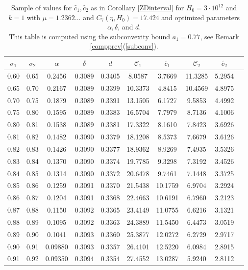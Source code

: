\documentclass[10pt]{amsart}
\newcommand{\s}{\sigma}
\theoremstyle{definition}
\numberwithin{equation}{section}
\begin{document}
%
\newpage
%
\begin{table}[h!]
\centering
\caption{Sample of values for $\tilde{c_1},\tilde{c_2}$ as in Corollary \ref{ZDinterval} for $H_0 = 3 \cdot 10^{12}$ and $k = 1$ with $\mu = 1.2362\ldots$ and $C_7(\eta, H_0) = 17.424$ and optimized parameters
$\alpha, \delta$, and $d$.\\ This table is computed using the subconvexity bound $a_1=0.77$, see Remark \ref{compprev}(\ref{subconv}).}\label{table:NSigmaOptTable2}
\begin{tabular}{cccccccccc}
\hline
$\s_1$ & $\s_2$ & $\alpha$ & $\delta$ & $d$ & $\mathcal{C}_1$ & $\tilde{c_1}$ & $\mathcal{C}_2$ & $\tilde{c_2}$ \\
\hline
0.60 & 0.65 & 0.2456 & 0.3089 & 0.3405 & 8.0587 & 3.7669 & 11.3285 & 5.2954 \\
0.65 & 0.70 & 0.2167 & 0.3089 & 0.3399 & 10.3373 & 4.8415 & 10.4569 & 4.8975 \\
0.70 & 0.75 & 0.1879 & 0.3089 & 0.3391 & 13.1505 & 6.1727 & 9.5853 & 4.4992 \\
0.75 & 0.80 & 0.1595 & 0.3089 & 0.3383 & 16.5704 & 7.7979 & 8.7136 & 4.1006 \\
0.80 & 0.81 & 0.1538 & 0.3089 & 0.3381 & 17.3322 & 8.1610 & 7.8423 & 3.6926 \\
0.81 & 0.82 & 0.1482 & 0.3090 & 0.3379 & 18.1208 & 8.5373 & 7.6679 & 3.6126 \\
0.82 & 0.83 & 0.1426 & 0.3090 & 0.3377 & 18.9362 & 8.9269 & 7.4935 & 3.5326 \\
0.83 & 0.84 & 0.1370 & 0.3090 & 0.3374 & 19.7785 & 9.3298 & 7.3192 & 3.4526 \\
0.84 & 0.85 & 0.1314 & 0.3090 & 0.3372 & 20.6478 & 9.7461 & 7.1448 & 3.3725 \\
0.85 & 0.86 & 0.1259 & 0.3091 & 0.3370 & 21.5438 & 10.1759 & 6.9704 & 3.2924 \\
0.86 & 0.87 & 0.1204 & 0.3091 & 0.3368 & 22.4663 & 10.6191 & 6.7960 & 3.2123 \\
0.87 & 0.88 & 0.1150 & 0.3092 & 0.3365 & 23.4149 & 11.0755 & 6.6216 & 3.1321 \\
0.88 & 0.89 & 0.1095 & 0.3092 & 0.3363 & 24.3889 & 11.5450 & 6.4473 & 3.0519 \\
0.89 & 0.90 & 0.1041 & 0.3093 & 0.3360 & 25.3877 & 12.0272 & 6.2729 & 2.9717 \\
0.90 & 0.91 & 0.09880 & 0.3093 & 0.3357 & 26.4101 & 12.5220 & 6.0984 & 2.8915 \\
0.91 & 0.92 & 0.09350 & 0.3094 & 0.3354 & 27.4552 & 13.0287 & 5.9240 & 2.8112 \\

\end{tabular}
\end{table}
\end{document}
